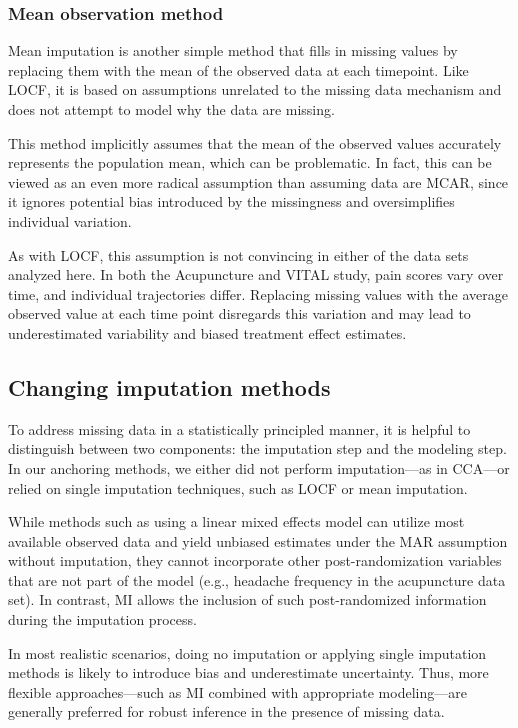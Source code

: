 \documentclass{article}
\begin{document}
\subsubsection{Mean observation method}\label{mean-observation-method}

Mean imputation is another simple method that fills in missing values by
replacing them with the mean of the observed data at each timepoint.
Like LOCF, it is based on assumptions unrelated to the missing data
mechanism and does not attempt to model why the data are missing.

This method implicitly assumes that the mean of the observed values
accurately represents the population mean, which can be problematic. In
fact, this can be viewed as an even more radical assumption than
assuming data are MCAR, since it ignores potential bias introduced by
the missingness and oversimplifies individual variation.

As with LOCF, this assumption is not convincing in either of the data
sets analyzed here. In both the Acupuncture and VITAL study, pain scores
vary over time, and individual trajectories differ. Replacing missing
values with the average observed value at each time point disregards
this variation and may lead to underestimated variability and biased
treatment effect estimates.

\subsection{Changing imputation
methods}\label{changing-imputation-methods}

To address missing data in a statistically principled manner, it is
helpful to distinguish between two components: the imputation step and
the modeling step. In our anchoring methods, we either did not perform
imputation---as in CCA---or relied on single imputation techniques, such
as LOCF or mean imputation.

While methods such as using a linear mixed effects model can utilize
most available observed data and yield unbiased estimates under the MAR
assumption without imputation, they cannot incorporate other
post-randomization variables that are not part of the model (e.g.,
headache frequency in the acupuncture data set). In contrast, MI allows
the inclusion of such post-randomized information during the imputation
process.

In most realistic scenarios, doing no imputation or applying single
imputation methods is likely to introduce bias and underestimate
uncertainty. Thus, more flexible approaches---such as MI combined with
appropriate modeling---are generally preferred for robust inference in
the presence of missing data.
\end{document}

